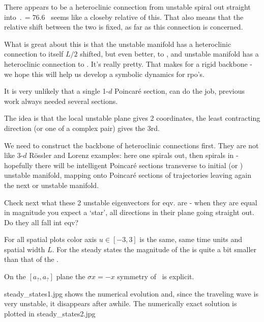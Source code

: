 There appears to be a heteroclinic connection from 
{\eqv}
unstable spiral out straight into  {\eqv}
$\period{} = 76.6$ \rpo\ seems like a closeby
relative of this.
That also means that the relative shift between the two {\eqva} is
fixed, as far as this connection is concerned.

What is great about
this is that the  unstable manifold has a heteroclinic connection to itself
$L/2$ shifted, but
even better, to , and  unstable manifold has a heteroclinic
connection to .
It's really pretty. That makes for a rigid backbone -
we hope this will help us develop a symbolic dynamics for rpo's.

It is very unlikely that a single 1-$d$ Poincar\'e section,
can do the job, previous work
always needed several sections.

The idea is that the local unstable plane gives 2 coordinates, the
least contracting direction (or one of a complex pair) gives the 3rd.

We need to construct the backbone of heteroclinic connections
first. They are not like 3-$d$ R\"ossler and Lorenz examples:
here one spirals out,
then spirals in - hopefully there will be intelligent Poincar\'e sections
transverse to initial  (or ) unstable manifold, mapping onto
Poincar\'e sections of trajectories leaving again
the next  or  unstable manifold.


Check next what these 2 unstable eigenvectors for  eqv. are - when they
are equal in magnitude you expect a `star', all directions in their plane
going straight out. Do they all fall int  eqv?

%

For all spatial plots color axis $u \in [-3, 3]$ is the same,
same time units and spatial width $L$.
For the steady states the magnitude of the  is quite
a bit smaller than that of the .

On the
    $[a_?,a_?]$ plane
    the $\sigma x = -x$ symmetry of \KSe\ is explicit.


steady\_states1.jpg shows the numerical evolution and, since the
traveling wave is very unstable, it disappears after awhile.
The numerically exact solution is plotted in steady\_states2.jpg

